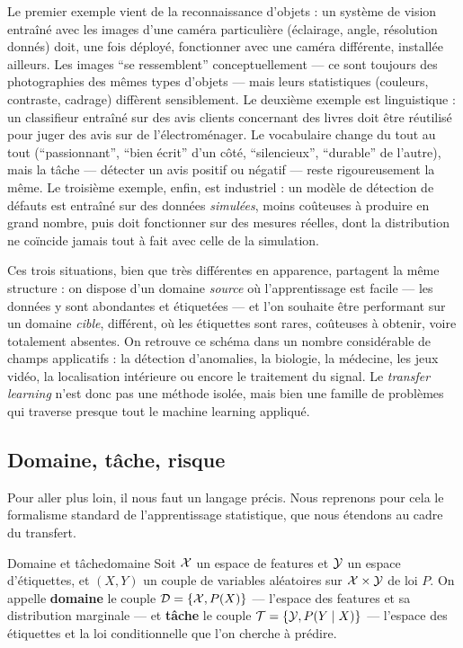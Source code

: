 \documentclass[11pt]{article}
\begin{document}
Le premier exemple vient de la reconnaissance d'objets : un système de vision entraîné avec les images
d'une caméra particulière (éclairage, angle, résolution donnés) doit, une fois déployé, fonctionner avec
une caméra différente, installée ailleurs. Les images \enquote{se ressemblent} conceptuellement --- ce
sont toujours des photographies des mêmes types d'objets --- mais leurs statistiques (couleurs,
contraste, cadrage) diffèrent sensiblement. Le deuxième exemple est linguistique : un classifieur entraîné
sur des avis clients concernant des livres doit être réutilisé pour juger des avis sur de
l'électroménager. Le vocabulaire change du tout au tout (\enquote{passionnant}, \enquote{bien écrit}
d'un côté, \enquote{silencieux}, \enquote{durable} de l'autre), mais la tâche --- détecter un avis
positif ou négatif --- reste rigoureusement la même. Le troisième exemple, enfin, est industriel : un
modèle de détection de défauts est entraîné sur des données \emph{simulées}, moins coûteuses à produire
en grand nombre, puis doit fonctionner sur des mesures réelles, dont la distribution ne coïncide jamais
tout à fait avec celle de la simulation.

Ces trois situations, bien que très différentes en apparence, partagent la même structure : on dispose
d'un domaine \emph{source} où l'apprentissage est facile --- les données y sont abondantes et
étiquetées --- et l'on souhaite être performant sur un domaine \emph{cible}, différent, où les
étiquettes sont rares, coûteuses à obtenir, voire totalement absentes. On retrouve ce schéma dans un
nombre considérable de champs applicatifs : la détection d'anomalies, la biologie, la médecine, les jeux
vidéo, la localisation intérieure ou encore le traitement du signal. Le \emph{transfer learning} n'est
donc pas une méthode isolée, mais bien une famille de problèmes qui traverse presque tout le machine
learning appliqué.

\subsection{Domaine, tâche, risque}

Pour aller plus loin, il nous faut un langage précis. Nous reprenons pour cela le formalisme standard de
l'apprentissage statistique, que nous étendons au cadre du transfert.

\begin{definition}{Domaine et tâche}{domaine}
Soit $\mathcal{X}$ un espace de features et $\mathcal{Y}$ un espace d'étiquettes, et $(X,Y)$ un couple de variables
aléatoires sur $\mathcal{X}\times\mathcal{Y}$ de loi $P$. On appelle \textbf{domaine} le couple $\mathcal{D} = \{\mathcal{X}, P(X)\}$ ---
l'espace des features et sa distribution marginale --- et \textbf{tâche} le couple $\mathcal{T} = \{\mathcal{Y},
P(Y\mid X)\}$ --- l'espace des étiquettes et la loi conditionnelle que l'on cherche à prédire.
\end{definition}
\end{document}

